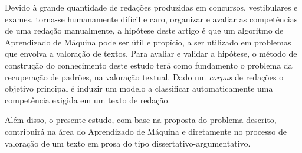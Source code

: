 Devido à grande quantidade de redações produzidas em concursos, vestibulares 
e exames, torna-se humanamente difícil e caro, organizar e avaliar as 
competências de uma redação manualmente, a hipótese deste artigo é que um 
algoritmo de Aprendizado de Máquina pode ser útil e propício, a ser utilizado 
em problemas que envolva a valoração de textos. Para avaliar e validar a 
hipótese, o método de construção do conhecimento deste estudo terá como 
fundamento o problema da recuperação de padrões, na valoração textual. Dado um 
\textit{corpus} de redações o objetivo principal é induzir um modelo a 
classificar automaticamente uma competência exigida em um texto de redação. 

Além disso, o presente estudo, com base na proposta do problema descrito, 
contribuirá na área do Aprendizado de Máquina e diretamente no processo de 
valoração de um texto em prosa do tipo dissertativo-argumentativo.